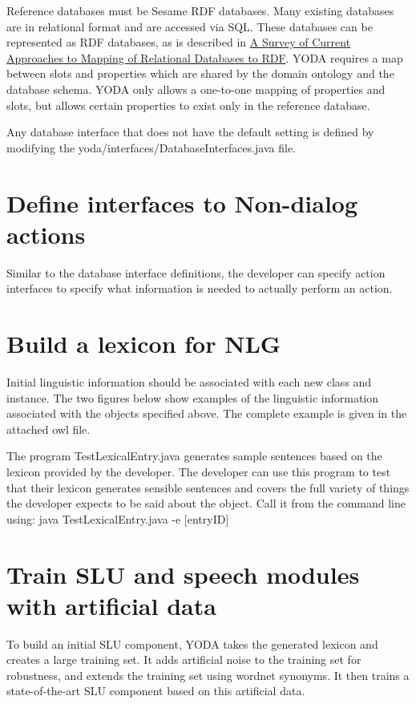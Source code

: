 \documentclass[10pt]{article}
\begin{document}
Reference databases must be Sesame RDF databases.
Many existing databases are in relational format and are accessed via SQL.
These databases can be represented as RDF databases, as is described in \href{http://www.w3.org/2005/Incubator/rdb2rdf/RDB2RDF_SurveyReport.pdf}{A Survey of Current Approaches to Mapping of Relational Databases to RDF}.
YODA requires a map between slots and properties which are shared by the domain ontology and the database schema.
YODA only allows a one-to-one mapping of properties and slots, but allows certain properties to exist only in the reference database.

Any database interface that does not have the default setting is defined by modifying the yoda/interfaces/DatabaseInterfaces.java file.




\section {Define interfaces to Non-dialog actions}
Similar to the database interface definitions, the developer can specify action interfaces to specify what information is needed to actually perform an action.

\section {Build a lexicon for NLG}
Initial linguistic information should be associated with each new class and instance.
The two figures below show examples of the linguistic information associated with the objects specified above.
The complete example is given in the attached owl file.

The program TestLexicalEntry.java generates sample sentences based on the lexicon provided by the developer.
The developer can use this program to test that their lexicon generates sensible sentences and covers the full variety of things the developer expects to be said about the object.
Call it from the command line using: java TestLexicalEntry.java -e [entryID]


\section {Train SLU and speech modules with artificial data}

To build an initial SLU component, YODA takes the generated lexicon and creates a large training set.
It adds artificial noise to the training set for robustness, and extends the training set using wordnet synonyms.
It then trains a state-of-the-art SLU component based on this artificial data.
\end{document}
